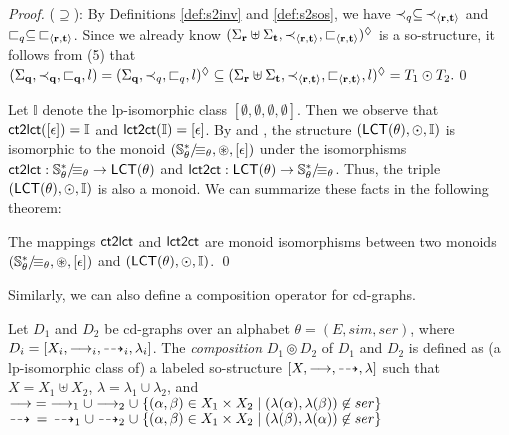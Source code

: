 \documentclass{llncs}
\begin{document}
\begin{proof}
($\supseteq$): By Definitions \ref{def:s2inv} and \ref{def:s2sos}, we have $\prec_{q}\subseteq\, \prec_{\langle \mathbf{r},\mathbf{t}\rangle}$ and $\sqsubset_{q}\subseteq\, \sqsubset_{\langle \mathbf{r},\mathbf{t}\rangle}$. Since we already know $(\Sigma_{\mathbf{r}}\uplus \Sigma_{\mathbf{t}},\prec_{\langle \mathbf{r},\mathbf{t}\rangle},\sqsubset_{\langle \mathbf{r},\mathbf{t}\rangle})^{\lozenge}$ is a so-structure, it follows from  (5) that \\
\mbox{\hspace{1.3cm}}$(\Sigma_{\mathbf{q}},\prec_{\mathbf{q}},\sqsubset_{\mathbf{q}},l) = (\Sigma_{\mathbf{q}},\prec_{q},\sqsubset_{q},l)^{\lozenge}\subseteq (\Sigma_{\mathbf{r}}\uplus \Sigma_{\mathbf{t}},\prec_{\langle \mathbf{r},\mathbf{t}\rangle},\sqsubset_{\langle \mathbf{r},\mathbf{t}\rangle},l)^{\lozenge} = T_{1}\odot T_{2}.$\qed
\end{proof}

Let $\mathbb{I}$ denote the lp-isomorphic class  $[\emptyset,\emptyset,\emptyset,\emptyset]$. Then we observe that $\mathsf{ct2lct}([\epsilon]) = \mathbb{I}$ and $\mathsf{lct2ct}(\mathbb{I}) = [\epsilon]$. By  and , the structure $(\mathsf{LCT}(\theta),\odot, \mathbb{I})$ is isomorphic to the monoid $({\mathbb{S}_\theta^*}/\!{\equiv_{\theta}},\circledast,[\epsilon])$ under the isomorphisms $\mathsf{ct2lct}:{\mathbb{S}_\theta^*}/\!{\equiv_{\theta}} \rightarrow \mathsf{LCT}(\theta)$ and $\mathsf{lct2ct}:\mathsf{LCT}(\theta)\rightarrow {\mathbb{S}_\theta^*}/\!{\equiv_{\theta}}$. Thus, the triple $(\mathsf{LCT}(\theta),\odot , \mathbb{I})$ is also a monoid. We can summarize these facts in the following theorem:
\begin{theorem}
The mappings $\mathsf{ct2lct}$ and $\mathsf{lct2ct}$ are monoid isomorphisms between two monoids $({\mathbb{S}_\theta^*}/\!{\equiv_{\theta}},\circledast,[\epsilon])$ and  $(\mathsf{LCT}(\theta),\odot, \mathbb{I})$. \qed
\end{theorem}

Similarly, we can also define a composition operator for cd-graphs.
\begin{definition} Let $D_{1}$ and $D_{2}$ be cd-graphs over an alphabet $\theta=(E,sim,ser)$, where $D_{i}=\left[ X_{i},\longrightarrow_{i},\dashrightarrow_{i},\lambda_{i} \right]$. The \emph{composition} $D_{1}\circledcirc D_{2}$ of $D_{1}$ and $D_{2}$ is defined as (a lp-isomorphic class of) a labeled so-structure $\left[ X,\longrightarrow,\dashrightarrow,\lambda \right]$ such that $X=X_{1}\uplus X_{2}$, $\lambda = \lambda_{1}\cup \lambda_{2}$, and \smallskip\\
\mbox{\hspace{1.5cm}}$\longrightarrow\;=\; \longrightarrow_{1}\cup \longrightarrow_{2}\cup\; \{(\alpha,\beta)\in X_{1}\times X_{2}\mid (\lambda(\alpha),\lambda(\beta))\not\in ser\}$\\
\mbox{\hspace{1.5cm}}$\dashrightarrow\;\, =\,\; \dashrightarrow_{1}\cup \dashrightarrow_{2}\cup\; \{(\alpha,\beta)\in X_{1}\times X_{2}\mid (\lambda(\beta),\lambda(\alpha))\not\in ser\}$ \EOD
\end{definition}
\end{document}
